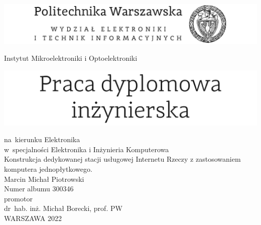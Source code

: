 \documentclass[12pt, twoside, openany]{mwrep}
\begin{document}
\begin{titlepage}
    \begin{center}
        {\sffamily
            \begin{center}
                \includegraphics[width=\textwidth]{titlepage/szablonEITI.png}\\   
            \end{center}
            \hfill \break
            \hfill \break
            Instytut Mikroelektroniki i Optoelektroniki\\
            \hfill \break
            \hfill \break
            \begin{center}
                \includegraphics[width=\textwidth]{titlepage/szablonINZ.png}\\
            \end{center}
            na~kierunku Elektronika\\
            w~specjalności Elektronika i Inżynieria Komputerowa\\
            \hfill \break
            \hfill \break
            \large
            Konstrukcja dedykowanej stacji usługowej Internetu Rzeczy z zastosowaniem komputera jednopłytkowego.\\
            \hfill \break
            \hfill \break
            \LARGE
            Marcin Michał Piotrowski\\
            \normalsize
            Numer albumu 300346\\
            \hfill \break
            \hfill \break
            promotor\\
            dr~hab. inż. Michał Borecki, prof. PW\\
            \vfill
            WARSZAWA 2022
        }
    \end{center}
    \newpage
    \thispagestyle{empty}
    \hfill
    
    \newpage

\end{titlepage}
\end{document}
